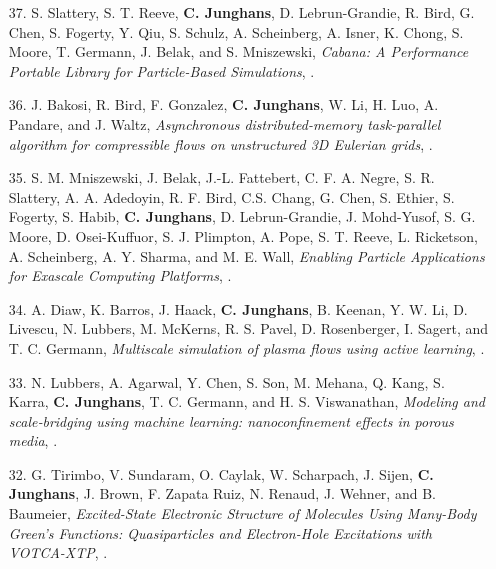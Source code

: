 \documentclass{article}
\begin{document}
\begin{enumerate}
   .
\item[37.] S. Slattery, S. T. Reeve, \textbf{C. Junghans}, D. Lebrun-Grandie, R. Bird, G. Chen, S. Fogerty, Y. Qiu, S. Schulz, A. Scheinberg, A. Isner, K. Chong, S. Moore, T. Germann, J. Belak, and S. Mniszewski,
   \textit{Cabana: A Performance Portable Library for Particle-Based Simulations},
   \htmladdnormallink{J. Open Source Softw. 7, 4115 (2022)]}{https://doi.org/10.21105/joss.04115}.
\item[36.] J. Bakosi, R. Bird, F. Gonzalez, \textbf{C. Junghans}, W. Li, H. Luo, A. Pandare, and J. Waltz,
  \textit{Asynchronous distributed-memory task-parallel algorithm for compressible flows on unstructured 3D Eulerian grids},
  .

\item[35.] S. M. Mniszewski, J. Belak, J.-L. Fattebert, C. F. A. Negre, S. R. Slattery, A. A. Adedoyin, R. F. Bird, C.S. Chang, G. Chen, S. Ethier, S. Fogerty, S. Habib, \textbf{C. Junghans}, D. Lebrun-Grandie, J. Mohd-Yusof, S. G. Moore, D. Osei-Kuffuor, S. J. Plimpton, A. Pope, S. T. Reeve, L. Ricketson, A. Scheinberg, A. Y. Sharma, and M. E. Wall,
  \textit{Enabling Particle Applications for Exascale Computing Platforms},
  .

\item[34.] A. Diaw, K. Barros, J. Haack, \textbf{C. Junghans}, B. Keenan, Y. W. Li, D. Livescu, N. Lubbers, M. McKerns, R. S. Pavel, D. Rosenberger, I. Sagert, and T. C. Germann, 
  \textit{Multiscale simulation of plasma flows using active learning},
  .

\item[33.] N. Lubbers, A. Agarwal, Y. Chen, S. Son, M. Mehana, Q. Kang, S. Karra, \textbf{C. Junghans}, T. C. Germann, and  H. S. Viswanathan,
  \textit{Modeling and scale‐bridging using machine learning: nanoconfinement effects in porous media},
  .

\item[32.] G. Tirimbo, V. Sundaram, O. Caylak, W. Scharpach, J. Sijen, \textbf{C. Junghans}, J. Brown, F. Zapata Ruiz, N. Renaud, J. Wehner, and B. Baumeier,
  \textit{Excited-State Electronic Structure of Molecules Using Many-Body Green’s Functions: Quasiparticles and Electron-Hole Excitations with VOTCA-XTP},
  .


\end{enumerate}
\end{document}
